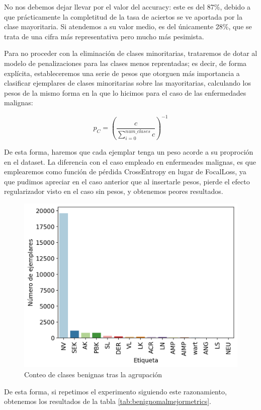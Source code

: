 No nos debemos dejar llevar por el valor del accuracy: este es del 87\%, debido a que prácticamente la completitud de la tasa de aciertos se ve aportada por la clase mayoritaria. Si atendemos a su valor medio, es del únicamente 28\%, que se trata de una cifra más representativa pero mucho más pesimista.

Para no proceder con la eliminación de clases minoritarias, trataremos de dotar al modelo de penalizaciones para las clases menos reprentadas; es decir, de forma explícita, estableceremos una serie de pesos que otorguen más importancia a clasificar ejemplares de clases minoritarias sobre las mayoritarias, calculando los pesos de la mismo forma en la que lo hicimos para el caso de las enfermedades malignas:

$$p_C =(\frac{c}{\sum_{i=0}^{num\_clases} c} )^{-1}$$

De esta forma, haremos que cada ejemplar tenga un peso acorde a su proproción en el dataset. La diferencia con el caso empleado en enfermeades malignas, es que emplearemos como función de pérdida CrossEntropy en lugar de FocalLoss, ya que pudimos apreciar en el caso anterior que al insertarle pesos, pierde el efecto regularizador visto en el caso sin pesos, y obtenemos peores resultados.

\begin{figure}[H]
	\centering
	\includegraphics[scale = 0.7]{imagenes/countbenign_corrected.png}
	\caption{Conteo de clases benignas tras la agrupación}
	\label {fig:buenasred}
\end{figure}

De esta forma, si repetimos el experimento siguiendo este razonamiento, obtenemos los resultados de la tabla \ref{tab:benignomalmejormetrics}.


